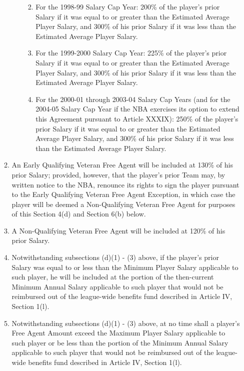 \documentclass[
]{book}
\providecommand{\tightlist}{%
  \setlength{\itemsep}{0pt}\setlength{\parskip}{0pt}}
\begin{document}
\begin{enumerate}
\begin{enumerate}
\begin{enumerate}
      \begin{enumerate}
      \def\labelenumiv{(\Alph{enumiv})}
      \tightlist
      \item
        For the 1998-99 Salary Cap Year: 200\% of the player's prior Salary if it was equal to or greater than the Estimated Average Player Salary, and 300\% of his prior Salary if it was less than the Estimated Average Player Salary.
      \item
        For the 1999-2000 Salary Cap Year: 225\% of the player's prior Salary if it was equal to or greater than the Estimated Average Player Salary, and 300\% of his prior Salary if it was less than the Estimated Average Player Salary.
      \item
        For the 2000-01 through 2003-04 Salary Cap Years (and for the 2004-05 Salary Cap Year if the NBA exercises its option to extend this Agreement pursuant to Article XXXIX): 250\% of the player's prior Salary if it was equal to or greater than the Estimated Average Player Salary, and 300\% of his prior Salary if it was less than the Estimated Average Player Salary.
      \end{enumerate}
    \end{enumerate}
  \item
    An Early Qualifying Veteran Free Agent will be included at 130\% of his prior Salary; provided, however, that the player's prior Team may, by written notice to the NBA, renounce its rights to sign the player pursuant to the Early Qualifying Veteran Free Agent Exception, in which case the player will be deemed a Non-Qualifying Veteran Free Agent for purposes of this Section 4(d) and Section 6(b) below.
  \item
    A Non-Qualifying Veteran Free Agent will be included at 120\% of his prior Salary.
  \item
    Notwithstanding subsections (d)(1) - (3) above, if the player's prior Salary was equal to or less than the Minimum Player Salary applicable to such player, he will be included at the portion of the then-current Minimum Annual Salary applicable to such player that would not be reimbursed out of the league-wide benefits fund described in Article IV, Section 1(l).
  \item
    Notwithstanding subsections (d)(1) - (3) above, at no time shall a player's Free Agent Amount exceed the Maximum Player Salary applicable to such player or be less than the portion of the Minimum Annual Salary applicable to such player that would not be reimbursed out of the league-wide benefits fund described in Article IV, Section 1(l).

\end{enumerate}
\end{enumerate}
\end{document}

